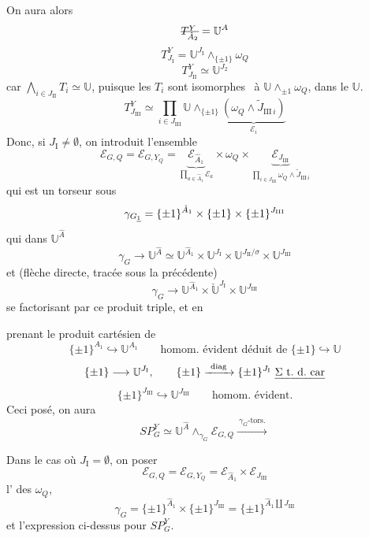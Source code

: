 \documentclass[11pt,a4paper]{article}
\begin{document}
On aura alors
\[
\text{\struck{$T^{Y}_{\hat{A}_2}$}} = \mathbb{U}^{A}
\]
\[
T^{Y}_{J_{\mathrm{I}}} = \mathbb{U}^{J_{\mathrm{I}}} \wedge_{\{\pm1\}} \omega_Q
\]
\[
T^{Y}_{J_{\mathrm{II}}} \simeq \mathbb{U}^{J_2}
\]
car $\bigwedge_{i\in J_{\mathrm{II}}} T_i \simeq \mathbb{U}$, puisque  les $T_i$ sont isomorphes \ à $\mathbb{U}\wedge_{\pm1}\omega_Q$, dans le  \ill{}  \ill{} \ill{} $\mathbb{U}$.
\[
T^{Y}_{J_{\mathrm{III}}} \simeq \prod_{i\in J_{\mathrm{III}}} \mathbb{U}\wedge_{\{\pm1\}}
\underbrace{(\omega_Q \wedge \tilde{J}_{\mathrm{III}\,i})}_{\mathcal{E}_i}
\]
Donc, si $J_{\mathrm{I}}\neq\emptyset$, on introduit l'ensemble
\[
\mathcal{E}_{G,Q} = \mathcal{E}_{G,Y_Q}
= \underbrace{\mathcal{E}_{\hat{A}_1}}_{\prod_{a\in\hat{A}_1}\mathcal{E}_a}
\times \omega_Q \times
\underbrace{\mathcal{E}_{J_{\mathrm{III}}}}_{\prod_{i\in J_{\mathrm{III}}}\omega_Q\wedge\tilde{J}_{\mathrm{III}\,i}}
\]
qui est un torseur sous
\[
\gamma_{G_{\uncertain{1}}} = \{\pm1\}^{\hat{A}_1}\times\{\pm1\}\times\{\pm1\}^{J_{\mathrm{III}}}
\]
qui  dans $\mathbb{U}^{\hat{A}}$
\[
\gamma_G \longrightarrow \mathbb{U}^{\hat{A}} \simeq \mathbb{U}^{\hat{A}_1}\times\mathbb{U}^{J_{\mathrm{I}}}
\times\mathbb{U}^{J_{\mathrm{II}}/\sigma}\times\mathbb{U}^{J_{\mathrm{III}}}
\]
et (flèche directe, tracée sous la précédente)
\[
\gamma_G \longrightarrow \mathbb{U}^{\hat{A}_1}\times\check{\mathbb{U}}^{J_{\mathrm{I}}}\times\mathbb{U}^{J_{\mathrm{III}}}
\]
 se factorisant par ce produit triple, et en

prenant le produit cartésien de
\[
\{\pm1\}^{A_1} \hookrightarrow \mathbb{U}^{A_1}
\qquad\text{homom.\ évident déduit de } \{\pm1\}\hookrightarrow\mathbb{U}
\]
\[
\{\pm1\} \longrightarrow \mathbb{U}^{J_{\mathrm{I}}},
\qquad
\{\pm1\}\xrightarrow{\ \mathrm{diag}\ }\{\pm1\}^{J_{\mathrm{I}}}
\ \text{\uncertain{$\Sigma$ t.\ d.\ car}}
\]
\[
\{\pm1\}^{J_{\mathrm{III}}} \hookrightarrow \mathbb{U}^{J_{\mathrm{III}}}
\qquad\text{homom.\ évident.}
\]
Ceci posé, on aura
\[
SP^{Y}_{G} \simeq \mathbb{U}^{\hat{A}} \wedge_{\gamma_G}
\mathcal{E}_{G,Q} \xrightarrow{\ \gamma_G\text{-tors.}\ }
\]

Dans le cas où $J_{\mathrm{I}}=\emptyset$, on  poser \ill{} 
\[
\mathcal{E}_{G,Q} = \mathcal{E}_{G,Y_Q} = \mathcal{E}_{\hat{A}_1}\times\mathcal{E}_{J_{\mathrm{III}}}
\]
 l' des  $\omega_Q$, \ill{}
\[
\gamma_G = \{\pm1\}^{\hat{A}_1}\times\{\pm1\}^{J_{\mathrm{III}}} = \{\pm1\}^{\hat{A}_1\amalg J_{\mathrm{III}}}
\]
et \ill{} \ill{} l'expression ci-dessus pour $SP^{Y}_{G}$.
\end{document}
